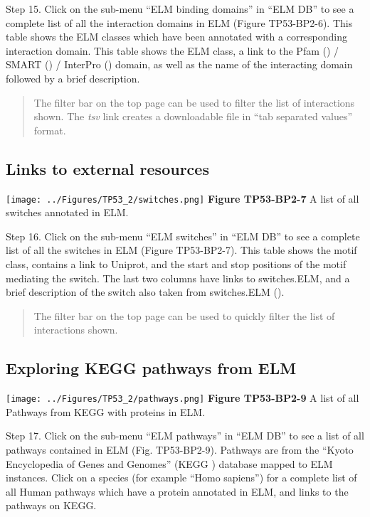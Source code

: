 Step 15. Click on the sub-menu ``ELM binding domains'' in ``ELM DB'' to
see a complete list of all the interaction domains in ELM (Figure
TP53-BP2-6). This table shows the ELM classes which have been annotated
with a corresponding interaction domain. This table shows the ELM class,
a link to the Pfam (\cite{26673716}) / SMART (\cite{25300481}) /
InterPro (\cite{27899635}) domain, as well as the name of the
interacting domain followed by a brief description.

\begin{quote}
The filter bar on the top page can be used to filter the list of
interactions shown. The \emph{tsv} link creates a downloadable file in
``tab separated values'' format.
\end{quote}

\subsection{Links to external
resources}\label{links-to-external-resources}

\texttt{[image: ../Figures/TP53\_2/switches.png]} \textbf{Figure
TP53-BP2-7} A list of all switches annotated in ELM.

Step 16. Click on the sub-menu ``ELM switches'' in ``ELM DB'' to see a
complete list of all the switches in ELM (Figure TP53-BP2-7). This table
shows the motif class, contains a link to Uniprot, and the start and
stop positions of the motif mediating the switch. The last two columns
have links to switches.ELM, and a brief description of the switch also
taken from switches.ELM (\cite{23550212}).

\begin{quote}
The filter bar on the top page can be used to quickly filter the list of
interactions shown.
\end{quote}

\subsection{Exploring KEGG pathways from
ELM}\label{exploring-kegg-pathways-from-elm}

\texttt{[image: ../Figures/TP53\_2/pathways.png]} \textbf{Figure
TP53-BP2-9} A list of all Pathways from KEGG with proteins in ELM.

Step 17. Click on the sub-menu ``ELM pathways'' in ``ELM DB'' to see a
list of all pathways contained in ELM (Fig. TP53-BP2-9). Pathways are
from the ``Kyoto Encyclopedia of Genes and Genomes'' (KEGG
\cite{26476454}) database mapped to ELM instances. Click on a species
(for example ``Homo sapiens'') for a complete list of all Human pathways
which have a protein annotated in ELM, and links to the pathways on
KEGG.

